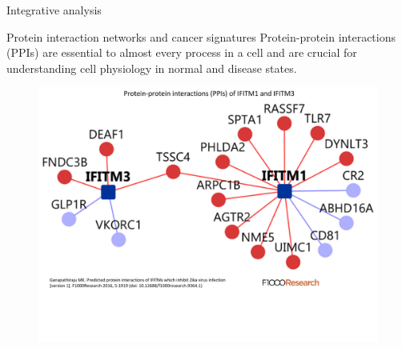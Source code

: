 \documentclass[slidestop,compress,11pt,xcolor=dvipsnames]{beamer}
\begin{document}
\begin{frame}{Integrative analysis}
 \vspace*{-0.3cm}
\begin{block}{Protein interaction networks and cancer signatures}
      Protein-protein interactions (PPIs) are essential to almost every process in a cell and are crucial for understanding cell physiology in normal and disease states.
\end{block}
\begin{figure}
 \centering
 \includegraphics[width=0.8\linewidth]{intro/PPIN2.pdf}
\end{figure}
\end{frame}
\end{document}
